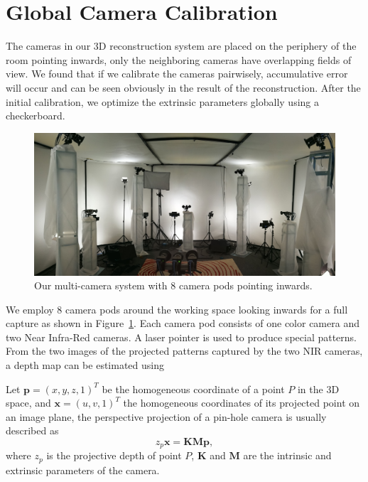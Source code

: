 
\section{Global Camera Calibration}
\label{sec:algorithm}



The cameras in our 3D reconstruction system are placed on the periphery of the room pointing inwards, only the neighboring cameras have overlapping fields of view. We found that if we calibrate the cameras pairwisely, accumulative error will occur and can be seen obviously in the result of the reconstruction. After the initial calibration,  we optimize the extrinsic parameters globally using a checkerboard.

\begin{figure}[!htp]
\centering
\includegraphics[scale=0.08]{image/rig.jpg}
\caption{Our multi-camera system with 8 camera pods pointing inwards.}
\label{fig:rig}
\end{figure}

We employ 8 camera pods around the working space looking inwards for a full capture as shown in Figure~\ref{fig:rig}. Each camera pod consists of one color camera and two Near Infra-Red cameras. A laser pointer is used to produce special patterns.
From the two images of the projected patterns captured by the two NIR cameras, a depth map can be estimated using 


Let $\mathbf{p}=(x,y,z,1)^{T}$ be the homogeneous coordinate of a point $P$ in the 3D space, and $\mathbf{x}=(u,v,1)^{T}$ the homogeneous coordinates of its projected point on an image plane, the perspective projection of a pin-hole camera is usually described as
\begin{equation}
z_{p}\mathbf{x}=\mathbf{K}\mathbf{M}\mathbf{p},
\end{equation}
where $z_{p}$ is the projective depth of point $P$, $\mathbf{K}$ and $\mathbf{M}$ are the intrinsic and extrinsic parameters of the camera.

